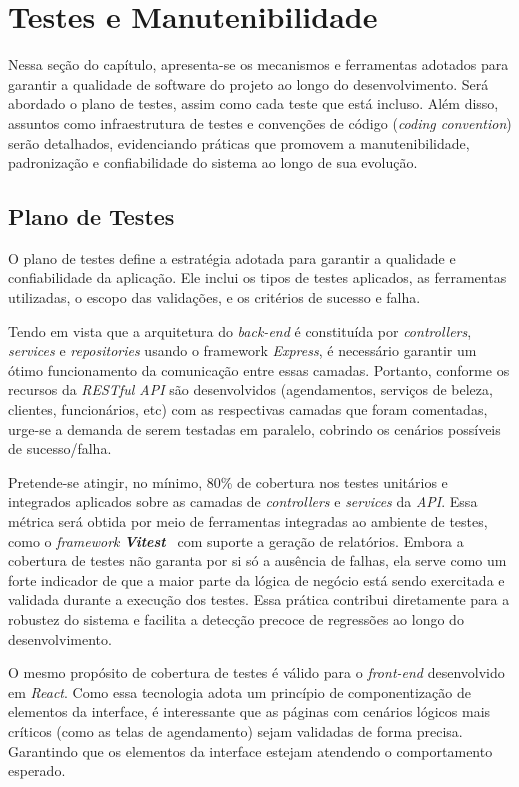 \section{Testes e Manutenibilidade}
Nessa seção do capítulo, apresenta-se os mecanismos e ferramentas adotados para garantir a qualidade de software do projeto ao longo do desenvolvimento.
Será abordado o plano de testes, assim como cada teste que está incluso. Além disso, assuntos como infraestrutura de testes e convenções de código (\textit{coding convention})
serão detalhados, evidenciando práticas que promovem a manutenibilidade, padronização e confiabilidade do sistema ao longo de sua evolução.

\subsection{Plano de Testes}
O plano de testes define a estratégia adotada para garantir a qualidade e confiabilidade da aplicação. 
Ele inclui os tipos de testes aplicados, as ferramentas utilizadas, o escopo das validações, e os critérios de sucesso e falha.

Tendo em vista que a arquitetura do \textit{back-end} é constituída por \textit{controllers}, \textit{services} e \textit{repositories} usando o framework \textit{Express}, 
é necessário garantir um ótimo funcionamento da comunicação entre essas camadas. Portanto, conforme os recursos da \textit{RESTful API} são desenvolvidos (agendamentos, serviços de beleza, clientes, funcionários, etc) com as respectivas camadas que foram comentadas, urge-se a demanda de serem testadas em paralelo, cobrindo os cenários possíveis de sucesso/falha. 

Pretende-se atingir, no mínimo, 80\% de cobertura nos testes unitários e integrados aplicados sobre as camadas de \textit{controllers} e \textit{services} da \textit{API}. Essa métrica será obtida por meio de ferramentas integradas ao ambiente de testes, como o \textit{framework} \textbf{\textit{Vitest}}~\cite{vitest-2025} com suporte a geração de relatórios. Embora a cobertura de testes não garanta por si só a ausência de falhas, ela serve como um forte indicador de que a maior parte da lógica de negócio está sendo exercitada e validada durante a execução dos testes. Essa prática contribui diretamente para a robustez do sistema e facilita a detecção precoce de regressões ao longo do desenvolvimento.

O mesmo propósito de cobertura de testes é válido para o \textit{front-end} desenvolvido em \textit{React}. Como essa tecnologia adota um princípio de componentização de elementos da interface,
é interessante que as páginas com cenários lógicos mais críticos (como as telas de agendamento) sejam validadas de forma precisa. Garantindo que os elementos da interface estejam atendendo o comportamento esperado.

